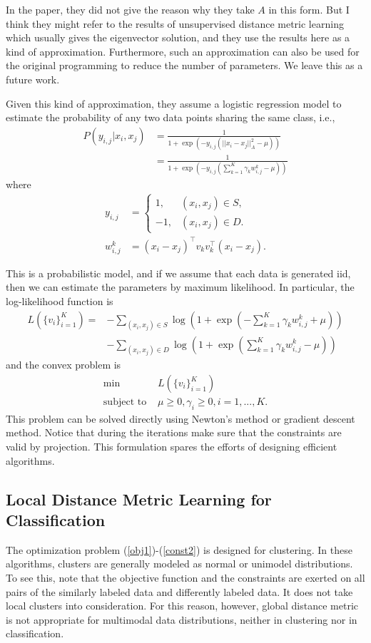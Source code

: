 \documentclass[12pt]{article}
\newcommand\T{^\top}
\newcommand{\st}{\text{subject to }}
\begin{document}
In the paper, they did not give the reason why they take $A$ in this form. But I think they might refer to the results of unsupervised distance metric learning which usually gives the eigenvector solution, and they use the results here as a kind of approximation. Furthermore, such an approximation can also be used for the original programming to reduce the number of parameters. We leave this as a future work.

Given this kind of approximation, they assume a logistic regression model to estimate the probability of any two data points sharing the same class, i.e.,
\begin{align*}
P(y_{i,j}|x_i,x_j)&=\frac{1}{1+\exp(-y_{i,j}(||x_i-x_j||_A^2 - \mu))} \\
& = \frac{1}{1+\exp(-y_{i,j}(\sum_{k=1}^K\gamma_kw^k_{i,j} - \mu))} 
\end{align*}
where 
\begin{align*}
y_{i,j} &= \left\{
\begin{array}{ll}
1, & (x_i,x_j)\in S,\\
-1, & (x_i,x_j)\in D.
\end{array}\right.
\\
w^k_{i,j}& = (x_i-x_j)\T v_kv_k\T (x_i-x_j).
\end{align*}

This is a probabilistic model, and if we assume that each data is generated iid, then we can estimate the parameters by maximum likelihood. In particular, the log-likelihood function is
\begin{align*}
L(\{v_i\}_{i=1}^K)  =& -\sum_{(x_i,x_j)\in S}\log\left(1+\exp\left(-\sum_{k=1}^K\gamma_kw^k_{i,j} + \mu\right)\right) \\
& - \sum_{(x_i,x_j)\in D}\log\left(1+\exp\left(\sum_{k=1}^K\gamma_kw^k_{i,j} - \mu\right)\right)
\end{align*}
and the convex problem is 
\begin{align*}
\min\ & L(\{v_i\}_{i=1}^K)\\
\st & \mu\geq 0, \gamma_i\geq 0,i=1,...,K.
\end{align*}
This problem can be solved directly using Newton's method or gradient descent method. Notice that during the iterations make sure that the constraints are valid by projection. This formulation spares the efforts of designing efficient algorithms.




\subsection{Local Distance Metric Learning for Classification}
The optimization problem (\ref{obj1})-(\ref{const2}) is designed for clustering. In these algorithms, clusters are generally modeled as normal or unimodel distributions. To see this, note that the objective function and the constraints are exerted on all pairs of the similarly labeled data and differently labeled data. It does not take local clusters into consideration. For this reason, however, global distance metric is not appropriate for multimodal data distributions, neither in clustering nor in classification.
\end{document}
